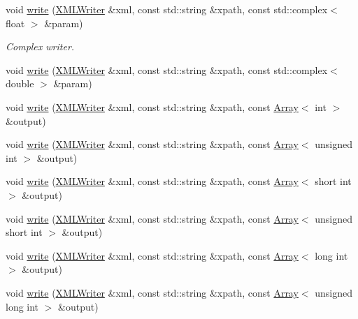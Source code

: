\begin{DoxyCompactItemize}
\item 
void \mbox{\hyperlink{group__io_ga120f4c9a4f62f8190c2d87d73124fded}{write}} (\mbox{\hyperlink{classADATXML_1_1XMLWriter}{X\+M\+L\+Writer}} \&xml, const std\+::string \&xpath, const std\+::complex$<$ float $>$ \&param)
\begin{DoxyCompactList}\small\item\em Complex writer. \end{DoxyCompactList}\item 
void \mbox{\hyperlink{group__io_ga841e4774bcd8f9d6b7d0d8f0ae20d34f}{write}} (\mbox{\hyperlink{classADATXML_1_1XMLWriter}{X\+M\+L\+Writer}} \&xml, const std\+::string \&xpath, const std\+::complex$<$ double $>$ \&param)
\item 
void \mbox{\hyperlink{group__io_ga79aaea02aba2cdc3c3374686eca9fd1e}{write}} (\mbox{\hyperlink{classADATXML_1_1XMLWriter}{X\+M\+L\+Writer}} \&xml, const std\+::string \&xpath, const \mbox{\hyperlink{classXMLArray_1_1Array}{Array}}$<$ int $>$ \&output)
\item 
void \mbox{\hyperlink{group__io_ga69642f017daf4afef39564d30ba6cba1}{write}} (\mbox{\hyperlink{classADATXML_1_1XMLWriter}{X\+M\+L\+Writer}} \&xml, const std\+::string \&xpath, const \mbox{\hyperlink{classXMLArray_1_1Array}{Array}}$<$ unsigned int $>$ \&output)
\item 
void \mbox{\hyperlink{group__io_ga5b987571b14df546fba76f92cb272d5d}{write}} (\mbox{\hyperlink{classADATXML_1_1XMLWriter}{X\+M\+L\+Writer}} \&xml, const std\+::string \&xpath, const \mbox{\hyperlink{classXMLArray_1_1Array}{Array}}$<$ short int $>$ \&output)
\item 
void \mbox{\hyperlink{group__io_gaae1762f924e581123d4df61dff9b9f5b}{write}} (\mbox{\hyperlink{classADATXML_1_1XMLWriter}{X\+M\+L\+Writer}} \&xml, const std\+::string \&xpath, const \mbox{\hyperlink{classXMLArray_1_1Array}{Array}}$<$ unsigned short int $>$ \&output)
\item 
void \mbox{\hyperlink{group__io_gaa86792c3bbc86036087623eee8f75f15}{write}} (\mbox{\hyperlink{classADATXML_1_1XMLWriter}{X\+M\+L\+Writer}} \&xml, const std\+::string \&xpath, const \mbox{\hyperlink{classXMLArray_1_1Array}{Array}}$<$ long int $>$ \&output)
\item 
void \mbox{\hyperlink{group__io_gaa89a8fb5de3a6ff255c50428b84a232c}{write}} (\mbox{\hyperlink{classADATXML_1_1XMLWriter}{X\+M\+L\+Writer}} \&xml, const std\+::string \&xpath, const \mbox{\hyperlink{classXMLArray_1_1Array}{Array}}$<$ unsigned long int $>$ \&output)
\item 

\end{DoxyCompactItemize}
